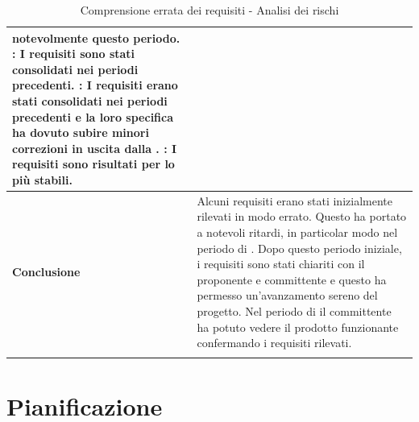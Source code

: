 \documentclass[12pt,a4paper]{article}
\begin{document}
\begin{center}
\begin{longtable}[H]{p{} p{}}
                notevolmente questo periodo. \newline
            \textbf{\FPD{}}: I requisiti sono stati consolidati nei periodi precedenti. \newline
            \textbf{\FC{}}: I requisiti erano stati consolidati nei periodi precedenti e la loro specifica ha dovuto subire minori correzioni in uscita dalla \RP{}. \newline
            \textbf{\FVV{}}: I requisiti sono risultati per lo più stabili. \\*
        \midrule
        \textbf{Conclusione} & Alcuni requisiti erano stati inizialmente rilevati in modo errato. Questo ha portato a notevoli ritardi, in particolar modo nel periodo di \FAD{}. Dopo questo periodo iniziale, i requisiti sono stati chiariti con il proponente e committente e questo ha permesso un'avanzamento sereno del progetto. Nel periodo di \FVV{} il committente ha potuto vedere il prodotto funzionante confermando i requisiti rilevati. \\*
		\bottomrule
		\caption{Comprensione errata dei requisiti - Analisi dei rischi}
	\end{longtable}
\end{center}


\newpage
\section{Pianificazione}
\end{document}

